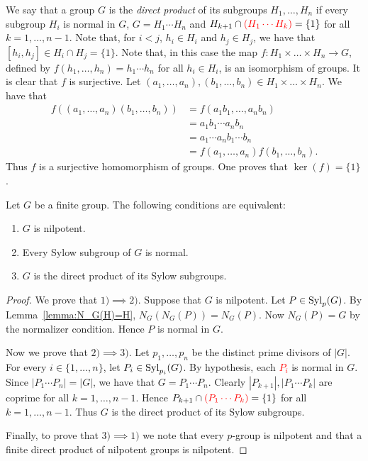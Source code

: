 We say that a group $G$ is the {\em direct product} of its subgroups $H_1,\dots ,H_n$ if every subgroup $H_i$ is normal in $G$, $G=H_1\cdots H_n$ and
$H_{k+1}\cap \textcolor{red}{(H_1\cdots H_{k})}=\{ 1\}$ for all $k=1,\dots, n-1$. Note that, for $i<j$, $h_i\in H_i$ and $h_j\in H_j$, we have that $[h_i,h_j]\in H_i\cap H_j=\{ 1\}$. Note that, in this case the map $f\colon H_1\times\dots\times H_n\rightarrow G$, defined by $f(h_1,\dots ,h_n)=h_1\cdots h_n$ for all $h_i\in H_i$, is an isomorphism of groups. It is clear that $f$ is surjective. Let $(a_1,\dots,a_n),(b_1,\dots,b_n)\in H_1\times\dots\times H_n$. We have that
\begin{align*}
f((a_1,\dots,a_n)(b_1,\dots,b_n))&=f(a_1b_1,\dots,a_nb_n)\\
&=a_1b_1\cdots a_nb_n\\
&=a_1\cdots a_nb_1\cdots b_n\\
&=f(a_1,\dots ,a_n)f(b_1,\dots ,b_n).
\end{align*}
Thus $f$ is a surjective homomorphism of groups. One proves that
$\ker(f)=\{ 1\}$. 


\begin{theorem}
	\label{thm:nilpotente:eq}
	Let $G$ be a finite group. The following conditions are equivalent: 
	\begin{enumerate}
		\item $G$ is nilpotent.
		\item Every Sylow subgroup of $G$ is normal.
		\item $G$ is the direct product of its Sylow subgroups. 
	\end{enumerate}
\end{theorem}

\begin{proof}
	We prove that $1)\implies 2)$. Suppose that $G$ is nilpotent. Let $P\in\mathrm{Syl}_p(G)$.  By Lemma~\ref{lemma:N_G(H)=H},  
	$N_G(N_G(P))=N_G(P)$. Now  $N_G(P)=G$ by the normalizer condition. Hence $P$ is normal in $G$.

	Now we prove that $2)\implies 3)$. Let $p_1,\dots,p_n$ be the distinct prime divisors of $|G|$. For every $i\in\{1,\dots,n\}$, let $P_i\in\mathrm{Syl}_{p_i}(G)$.
	By hypothesis, each \textcolor{red}{$P_i$} is normal in $G$. Since $|P_1\cdots P_n|=|G|$, we have that $G=P_1\cdots P_n$. Clearly
	$|P_{k+1}|, |P_1\cdots P_k|$ are coprime for all $k=1,\dots, n-1$. Hence $P_{k+1}\cap \textcolor{red}{(P_1\cdots P_k)}=\{ 1\}$ for all $k=1,\dots, n-1$. Thus $G$ is the direct product of its Sylow subgroups. 

	Finally, to prove that $3)\implies 1)$ we note that every 
	$p$-group is nilpotent and that a finite direct product of nilpotent groups is nilpotent. 
\end{proof}


